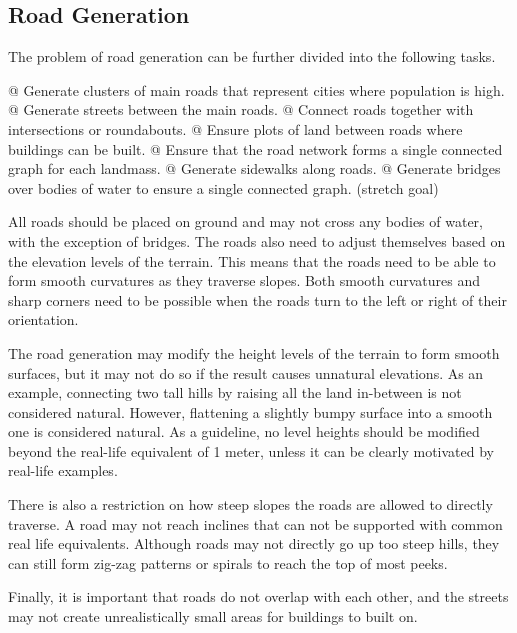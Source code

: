 \subsection{Road Generation}

The problem of road generation can be further divided into the following tasks.

\begin{easylist}
  @ Generate clusters of main roads that represent cities where population is high.
  @ Generate streets between the main roads.
  @ Connect roads together with intersections or roundabouts.
  @ Ensure plots of land between roads where buildings can be built.
  @ Ensure that the road network forms a single connected graph for each landmass.
  @ Generate sidewalks along roads.
  @ Generate bridges over bodies of water to ensure a single connected graph. (stretch goal)
\end{easylist}

All roads should be placed on ground and may not cross any bodies of water, with the exception of bridges.
The roads also need to adjust themselves based on the elevation levels of the terrain.
This means that the roads need to be able to form smooth curvatures as they traverse slopes.
Both smooth curvatures and sharp corners need to be possible when the roads turn to the left or right of their orientation.

The road generation may modify the height levels of the terrain to form smooth surfaces, but it may not do so if the result causes unnatural elevations.
As an example, connecting two tall hills by raising all the land in-between is not considered natural.
However, flattening a slightly bumpy surface into a smooth one is considered natural.
As a guideline, no level heights should be modified beyond the real-life equivalent of 1 meter, unless it can be clearly motivated by real-life examples.

There is also a restriction on how steep slopes the roads are allowed to directly traverse.
A road may not reach inclines that can not be supported with common real life equivalents.
Although roads may not directly go up too steep hills, they can still form zig-zag patterns or spirals to reach the top of most peeks.

Finally, it is important that roads do not overlap with each other, and the streets may not create unrealistically small areas for buildings to built on.